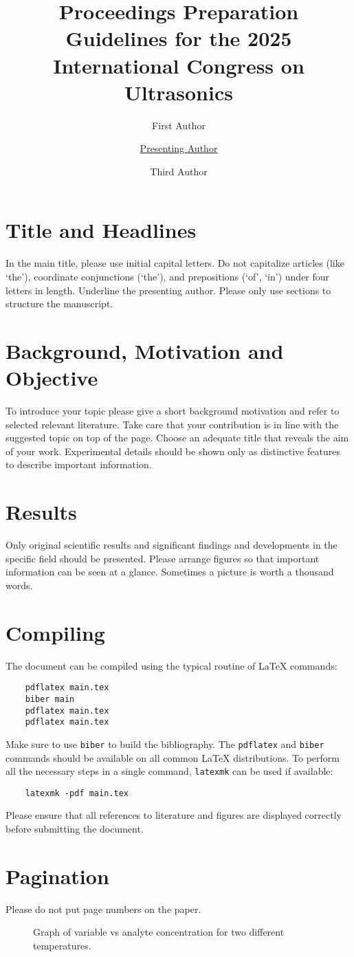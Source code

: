 \documentclass{ama}
\title{Proceedings Preparation Guidelines for the 2025 International Congress on Ultrasonics}
\author[1]{First Author}
\author[1]{\underline{Presenting Author}}
\author[2]{Third Author}
\affil[1]{Institution or company, address and country}
\affil[2]{Institution or company, address and country}
\begin{document}
\section{Title and Headlines}
In the main title, please use initial capital letters.
Do not capitalize articles (like `the'), coordinate conjunctions (`the'), and prepositions (`of', `in') under four letters in length.
Underline the presenting author.
Please only use sections to structure the manuscript.

\section{Background, Motivation and Objective}
To introduce your topic please give a short background motivation and refer to selected relevant literature.
Take care that your contribution is in line with the suggested topic on top of the page.
Choose an adequate title that reveals the aim of your work.
Experimental details should be shown only as distinctive features to describe important information.

\section{Results}
Only original scientific results and significant findings and developments in the specific field should be presented.
Please arrange figures so that important information can be seen at a glance.
Sometimes a picture is worth a thousand words.

\section{Compiling}
The document can be compiled using the typical routine of \LaTeX{} commands:
%
\begin{verbatim}
    pdflatex main.tex
    biber main
    pdflatex main.tex
    pdflatex main.tex
\end{verbatim}
%
Make sure to use \texttt{biber} to build the bibliography.
The \texttt{pdflatex} and \texttt{biber} commands should be available on all common \LaTeX{} distributions.
To perform all the necessary steps in a single command, \texttt{latexmk} can be used if available:
%
\begin{verbatim}
    latexmk -pdf main.tex
\end{verbatim}
%
Please ensure that all references to literature and figures are displayed correctly before submitting the document.

\section{Pagination}
Please do not put page numbers on the paper.
%
\begin{figure}
    \centering
    
    \caption{Graph of variable vs analyte concentration for two different temperatures.}\label{fig:ex1}
\end{figure}
\end{document}
